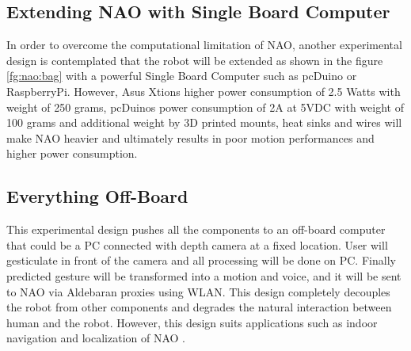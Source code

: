 \subsection*{Extending NAO with Single Board Computer} In order to overcome the computational limitation of NAO, another experimental design is contemplated that the robot will be extended as shown in the figure \ref{fg:nao:bag} with a powerful Single Board Computer such as pcDuino or RaspberryPi. However, Asus Xtions higher power consumption of 2.5 Watts with weight of 250 grams, pcDuinos power consumption of 2A at 5VDC with weight of 100 grams and additional weight by 3D printed mounts, heat sinks and wires will make NAO heavier and ultimately results in poor motion performances and higher power consumption. 



\subsection*{Everything Off-Board} This experimental design pushes all the components to an off-board computer that could be a PC connected with depth camera at a fixed location. User will gesticulate in front of the camera and all processing will be done on PC. Finally predicted gesture will be transformed into a motion and voice, and it will be sent to NAO via Aldebaran proxies using WLAN. This design completely decouples the robot from other components and degrades the natural interaction between human and the robot. However, this design suits applications such as indoor navigation and localization of NAO \cite{20}.

